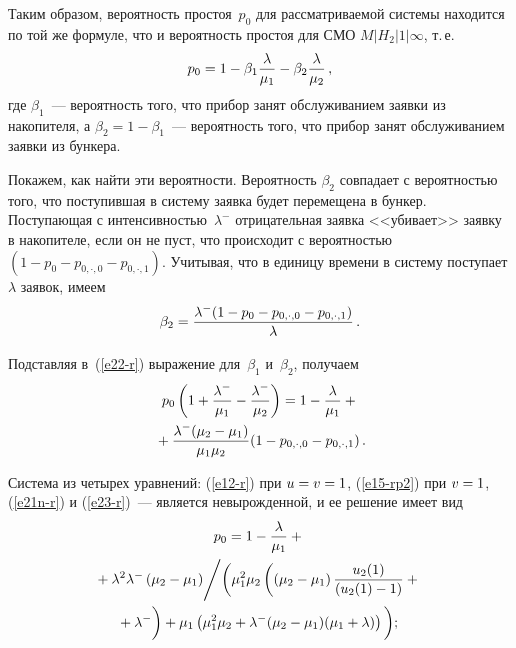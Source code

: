\begin{multicols}{2}
Таким образом, вероятность простоя~$p_0$ для рассматриваемой системы
находится по той же формуле, что и вероятность простоя для СМО $M|H_2|1|\infty$,
т.\,е.\
\begin{equation}
\label{e22-r}
p_0= 1-\beta_1 \displaystyle\frac{\displaystyle \lambda\mathstrut}{\displaystyle \mu_1\mathstrut} - \beta_2 \displaystyle\frac{\displaystyle \lambda\mathstrut}{\displaystyle \mu_2\mathstrut}\,,
\end{equation}
где $\beta_1$~--- вероятность того, что прибор занят обслуживанием
заявки из накопителя, а $\beta_2=1-\beta_1$~--- вероятность того, что прибор
занят обслуживанием заявки из бункера.

Покажем, как найти эти вероятности. Вероятность $\beta_2$
совпадает с вероятностью того, что поступившая в систему заявка
будет перемещена в бункер. Поступающая с интенсивностью~$\lambda^-$ отрицательная заявка
<<убивает>> заявку в накопителе, если он не пуст, что
происходит с вероятностью $(1-p_0-p_{0,\cdot,0} - p_{0,\cdot,1})$.
Учитывая, что в единицу времени в систему поступает $\lambda$ заявок, имеем
\begin{equation*}
\beta_2= \displaystyle\frac{\displaystyle \lambda^- (1-p_0-p_{0,\cdot,0} - p_{0,\cdot,1})\mathstrut}{\displaystyle \lambda\mathstrut}\,.
\end{equation*}

Подставляя в~(\ref{e22-r}) выражение для~$\beta_{1}$ и~$\beta_{2}$,
получаем
\begin{multline}
\label{e23-r}
p_0 \left ( 1+ \displaystyle\frac{\displaystyle \lambda^- \mathstrut}{\displaystyle \mu_1\mathstrut} - \displaystyle\frac{\displaystyle \lambda^-\mathstrut}{\displaystyle \mu_2\mathstrut}
\right ) =
1-\displaystyle\frac{\displaystyle \lambda\mathstrut}{\displaystyle \mu_1\mathstrut} +{}\\
{}+ \displaystyle\frac{\displaystyle \lambda^- (\mu_2 - \mu_1)\mathstrut}{\displaystyle \mu_1 \mu_2\mathstrut} (1- p_{0,\cdot,0} - p_{0,\cdot,1})\,.
\end{multline}

Система из четырех уравнений: (\ref{e12-r}) при $u=v\hm=1$, (\ref{e15-rp2}) при $v\hm=1$,
(\ref{e21n-r}) и (\ref{e23-r})~--- является не\-вы\-рож\-ден\-ной, и ее решение имеет вид
\begin{multline*}
p_0 =1-\fr{ \lambda}{\mu_1}+{}\\
{}+
\lambda^2 \lambda^- \left(\mu_2 - \mu_1\right)\!\Bigg /\!\left(\mu_1^2 \mu_2
\left(
\left(\mu_2 - \mu_1\right) \fr{u_2(1)}{(u_2(1) - 1)} +{}\right.\right.\\
\!\!\!\left.\left.{}+\lambda^-
\vphantom{\fr{u_2(1)}{(u_2(1) - 1)}}\right)
+\mu_1\left(\mu_1^2 \mu_2 + \lambda^- (\mu_2 - \mu_1) (\mu_1 + \lambda)\right)
\vphantom{\fr{u_2(1)}{(u_2(1) - 1)}}\right)\!\!
\,;
\end{multline*}

\vspace*{-6pt}


\end{multicols}
